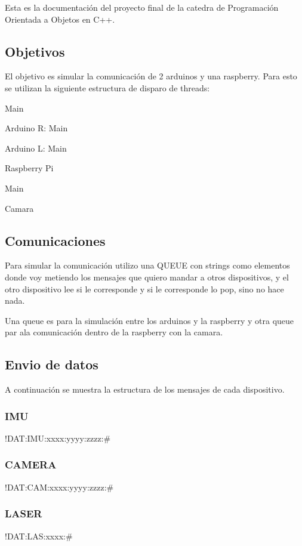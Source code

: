 Esta es la documentación del proyecto final de la catedra de Programación Orientada a Objetos en C++.

\subsection*{Objetivos}



El objetivo es simular la comunicación de 2 arduinos y una raspberry. Para esto se utilizan la siguiente estructura de disparo de threads\+:
\begin{DoxyItemize}
\item Main
\begin{DoxyItemize}
\item Arduino R\+: Main
\item Arduino L\+: Main
\item Raspberry Pi
\begin{DoxyItemize}
\item Main
\item Camara
\end{DoxyItemize}
\end{DoxyItemize}
\end{DoxyItemize}

\subsection*{Comunicaciones}

Para simular la comunicación utilizo una Q\+U\+E\+UE con strings como elementos donde voy metiendo los mensajes que quiero mandar a otros dispositivos, y el otro dispositivo lee si le corresponde y si le corresponde lo pop, sino no hace nada.

Una queue es para la simulación entre los arduinos y la raspberry y otra queue par ala comunicación dentro de la raspberry con la camara.

\subsection*{Envio de datos}

A continuación se muestra la estructura de los mensajes de cada dispositivo. \subsubsection*{I\+MU}

!\+D\+AT\+:I\+M\+U\+:xxxx\+:yyyy\+:zzzz\+:\#

\subsubsection*{C\+A\+M\+E\+RA}

!\+D\+AT\+:C\+A\+M\+:xxxx\+:yyyy\+:zzzz\+:\#

\subsubsection*{L\+A\+S\+ER}

!\+D\+AT\+:L\+A\+S\+:xxxx\+:\# 